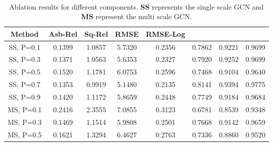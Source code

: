 \documentclass[journal]{IEEEtran}
\begin{document}
\begin{table*}[t]


\centering
\captionsetup{justification=centering}
\caption{\\Ablation results for different components. \textbf{SS} represents the single scale GCN and \textbf{MS} represent the multi scale GCN.}
\begin{tabular}{|c|c|c|c|c|c|c|c|}
\hline
\textbf{Method} & \textbf{Asb-Rel} & \textbf{Sq-Rel} & \textbf{RMSE}   & \textbf{RMSE-Log} &  &  &  \\ \hline\hline
SS, P=0.1                                                      & 0.1399            & 1.0857           & 5.7320          & 0.2356            & 0.7862                    & 0.9221                    & 0.9699                    \\ \hline
SS, P=0.3                                                      & 0.1371            & 1.0563           & 5.6353          & 0.2327            & 0.7920                    & 0.9252                    & 0.9699                    \\ \hline
SS, P=0.5                                                      & 0.1520            & 1.1781           & 6.0753          & 0.2596            & 0.7468                    & 0.9104                    & 0.9640                    \\ \hline
SS, P=0.7                                                      & 0.1353            & 0.9919           & 5.1480          & 0.2135            & 0.8141                    & 0.9394                    & 0.9775                    \\ \hline
SS, P=0.9                                                      & 0.1420            & 1.1172           & 5.8659          & 0.2448            & 0.7749                    & 0.9184                    & 0.9684                    \\ \hline
MS, P=0.1                                                      & 0.2416            & 2.3555           & 7.0855          & 0.3123            & 0.6781                    & 0.8539                    & 0.9348                    \\ \hline
MS, P=0.3                                                      & 0.1469            & 1.1514           & 5.9808          & 0.2501            & 0.7668                    & 0.9142                    & 0.9659                    \\ \hline
MS, P=0.5                                                      & 0.1621            & 1.3294           & 6.4627          & 0.2763            & 0.7336                    & 0.8860                    & 0.9520                    \\ \hline

\end{tabular}
\end{table*}
\end{document}
